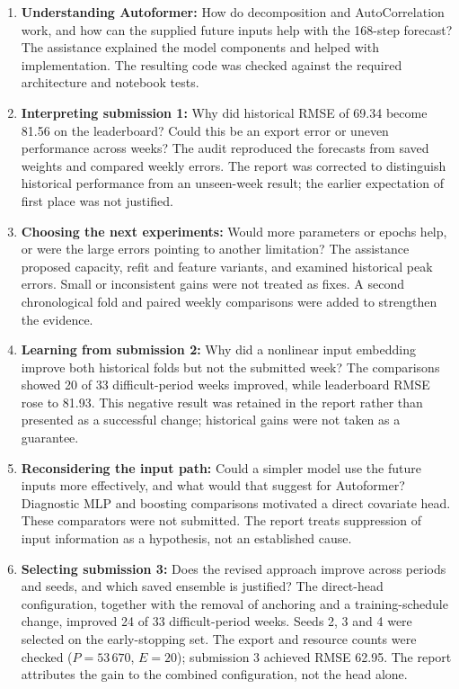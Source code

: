 \begin{enumerate}
  \item \textbf{Understanding Autoformer:} How do decomposition and AutoCorrelation
        work, and how can the supplied future inputs help with the 168-step forecast?
        The assistance explained the model components and helped with implementation.
        The resulting code was checked against the required architecture and notebook tests.
  \item \textbf{Interpreting submission 1:} Why did historical RMSE of 69.34 become
        81.56 on the leaderboard? Could this be an export error or uneven performance
        across weeks? The audit reproduced the forecasts from saved weights and compared
        weekly errors. The report was corrected to distinguish historical performance
        from an unseen-week result; the earlier expectation of first place was not justified.
  \item \textbf{Choosing the next experiments:} Would more parameters or epochs help,
        or were the large errors pointing to another limitation? The assistance proposed
        capacity, refit and feature variants, and examined historical peak errors.
        Small or inconsistent gains were not treated as fixes. A second chronological
        fold and paired weekly comparisons were added to strengthen the evidence.
  \item \textbf{Learning from submission 2:} Why did a nonlinear input embedding
        improve both historical folds but not the submitted week? The comparisons showed
        20 of 33 difficult-period weeks improved, while leaderboard RMSE rose to 81.93.
        This negative result was retained in the report rather than presented as a
        successful change; historical gains were not taken as a guarantee.
  \item \textbf{Reconsidering the input path:} Could a simpler model use the future
        inputs more effectively, and what would that suggest for Autoformer?
        Diagnostic MLP and boosting comparisons motivated a direct covariate head.
        These comparators were not submitted. The report treats suppression of input
        information as a hypothesis, not an established cause.
  \item \textbf{Selecting submission 3:} Does the revised approach improve across
        periods and seeds, and which saved ensemble is justified? The direct-head
        configuration, together with the removal of anchoring and a training-schedule change, improved
        24 of 33 difficult-period weeks. Seeds 2, 3 and 4 were selected on the
        early-stopping set. The export and resource counts were checked
        ($P=53\,670$, $E=20$); submission 3 achieved RMSE 62.95.
        The report attributes the gain to the combined configuration, not the head alone.
\end{enumerate}

